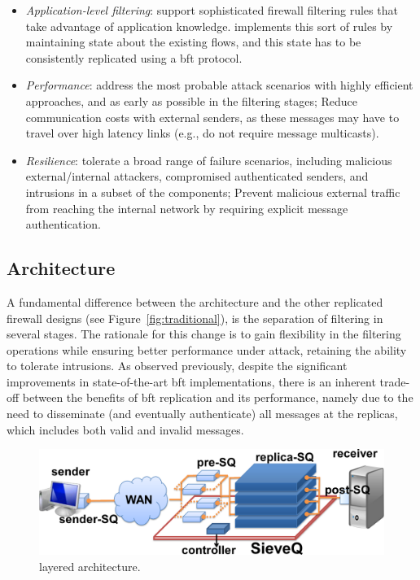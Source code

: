 \begin{itemize}

\item \emph{Application-level filtering}: support sophisticated firewall filtering rules that take advantage of application knowledge. \sieveq implements this sort of rules by maintaining state about the existing flows, and this state has to be consistently replicated using a \gls{bft} protocol.

\item \emph{Performance}: address the most probable attack scenarios with highly efficient approaches, and as early as possible in the filtering stages; Reduce communication costs with external senders, as these messages may have to travel over high latency links (e.g., do not require message multicasts).	

\item \emph{Resilience}: tolerate a broad range of failure scenarios, including malicious external/internal attackers, compromised authenticated senders, and intrusions in a subset of the \sieveq components; Prevent malicious external traffic from reaching the internal network by requiring explicit message authentication.

\end{itemize}

\subsection{\sieveq Architecture}

A fundamental difference between the \sieveq architecture and the other replicated firewall designs (see Figure~\ref{fig:traditional}), is the separation of filtering in several stages.
The rationale for this change is to gain flexibility in the filtering operations while ensuring better performance under attack, retaining the ability to tolerate intrusions.
As observed previously, despite the significant improvements in state-of-the-art \gls{bft} implementations, there is an inherent trade-off between the benefits of \gls{bft} replication and its performance, namely due to the need to disseminate (and eventually authenticate) all messages at the replicas, which includes both valid and invalid messages.

\begin{figure}[h]
\begin{center}
\includegraphics[width=0.9\columnwidth]{images/images/arch.pdf}
\caption{\sieveq layered architecture.}
\label{fig:arch}
\end{center}
\end{figure}


